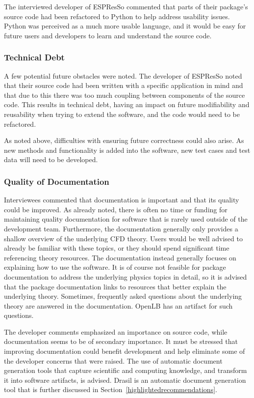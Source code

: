 \documentclass[final, 3p, times, authoryear]{elsarticle}
\begin{document}
The interviewed developer of ESPResSo commented that parts of their package's
source code had been refactored to Python to help address usability issues.
Python was perceived as a much more usable language, and it would be easy for
future users and developers to learn and understand the source code. 

\subsubsection{Technical Debt}

A few potential future obstacles were noted. The developer of ESPResSo noted
that their source code had been written with a specific application in mind and
that due to this there was too much coupling between components of the source
code. This results in technical debt, having an impact on future modifiability
and reusability when trying to extend the software, and the code would need to
be refactored.

As noted above, difficulties with ensuring future correctness could also arise.
As new methods and functionality is added into the software, new test cases and
test data will need to be developed.

\subsubsection{Quality of Documentation}

Interviewees commented that documentation is important and that its quality
could be improved. As already noted, there is often no time or funding for
maintaining quality documentation for software that is rarely used outside of
the development team. Furthermore, the documentation generally only provides a
shallow overview of the underlying CFD theory. Users would be well advised to
already be familiar with these topics, or they should spend significant time
referencing theory resources. The documentation instead generally focuses on
explaining how to use the software. It is of course not feasible for package
documentation to address the underlying physics topics in detail, so it is
advised that the package documentation links to resources that better explain
the underlying theory. Sometimes, frequently asked questions about the
underlying theory are answered in the documentation. OpenLB has an artifact for
such questions.

The developer comments emphasized an importance on source code, while
documentation seems to be of secondary importance. It must be stressed that
improving documentation could benefit development and help eliminate some of the
developer concerns that were raised. The use of automatic document generation
tools that capture scientific and computing knowledge, and transform it into
software artifacts, is advised. Drasil is an automatic document generation tool
that is further discussed in Section~\ref{highlightedrecommendations}.
\end{document}
